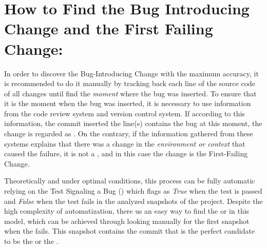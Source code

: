 \documentclass[a4paper, 12pt]{book}
\begin{document}


\section{How to Find the Bug Introducing Change and the First Failing Change:}
In order to discover the Bug-Introducing Change with the maximum accuracy, it is recommended to do it manually by tracking back each line of the source code of all changes until find the \emph{moment} where the bug was inserted. To ensure that it is the moment when the bug was inserted, it is necessary to use information from the code review system and version control system. If according to this information, the commit inserted the line(s) contains the bug at this moment, the change is regarded as \BIC. On the contrary, if the information gathered from these systems explains that there was a change in the \emph{environment or context} that caused the failure, it is not a \BIC, and in this case the change is the First-Failing Change. 

Theoretically and under optimal conditions, this process can be fully automatic relying on the Test Signaling a Bug (\TSB) which flags as \emph{True} when the test is passed and \emph{False} when the test fails in the analyzed snapshots of the project. Despite the high complexity of automatization, there us an easy way to find the \BIC or \FFC in this model, which can be achieved through looking manually for the first snapshot when the \TSB fails. This snapshot contains the commit that is the perfect candidate to be the \BIC or the \FFC.
\end{document}
